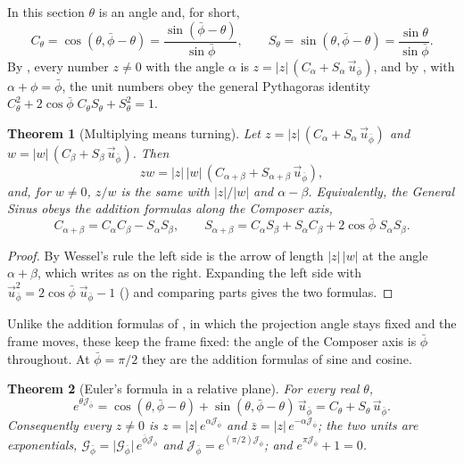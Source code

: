 \documentclass[11pt,a4paper]{amsart}
\theoremstyle{plain}
\newtheorem{theorem}{Theorem}[section]
\theoremstyle{definition}
\theoremstyle{remark}
\newcommand{\pb}{\bar{\phi}}                     %
\newcommand{\Gp}{\mathcal{G}_{\bar{\phi}}}       %
\newcommand{\up}{\vec{u}_{\bar{\phi}}}           %
\newcommand{\Jp}{\mathcal{J}_{\bar{\phi}}}       %
\begin{document}
In this section $\theta$ is an angle and, for short,
\[
C_\theta = \cos(\theta, \pb - \theta) = \frac{\sin(\pb - \theta)}{\sin\pb} , \qquad S_\theta = \sin(\theta, \pb - \theta) = \frac{\sin\theta}{\sin\pb} .
\]
By , every number $z \neq 0$ with the angle $\alpha$ is $z = \lvert z\rvert\,(C_\alpha + S_\alpha\,\up)$, and by , with $\alpha + \phi = \pb$, the unit numbers obey the general Pythagoras identity $C_\theta^2 + 2\cos\pb\;C_\theta S_\theta + S_\theta^2 = 1$.

\begin{theorem}[Multiplying means turning]\label{thm:turning}
Let $z = \lvert z\rvert\,(C_\alpha + S_\alpha\,\up)$ and $w = \lvert w\rvert\,(C_\beta + S_\beta\,\up)$. Then
\[
zw = \lvert z\rvert\,\lvert w\rvert\,(C_{\alpha + \beta} + S_{\alpha + \beta}\,\up) ,
\]
and, for $w \neq 0$, $z/w$ is the same with $\lvert z\rvert/\lvert w\rvert$ and $\alpha - \beta$. Equivalently, the General Sinus obeys the \emph{addition formulas along the Composer axis},
\[
C_{\alpha + \beta} = C_\alpha C_\beta - S_\alpha S_\beta , \qquad S_{\alpha + \beta} = C_\alpha S_\beta + S_\alpha C_\beta + 2\cos\pb\;S_\alpha S_\beta .
\]
\end{theorem}

\begin{proof}
By Wessel's rule the left side is the arrow of length $\lvert z\rvert\,\lvert w\rvert$ at the angle $\alpha + \beta$, which  writes as on the right. Expanding the left side with $\up^2 = 2\cos\pb\;\up - 1$ () and comparing parts gives the two formulas.
\end{proof}

Unlike the addition formulas of , in which the projection angle stays fixed and the frame moves, these keep the frame fixed: the angle of the Composer axis is $\pb$ throughout. At $\pb = \pi/2$ they are the addition formulas of sine and cosine.

\begin{theorem}[Euler's formula in a relative plane]\label{thm:euler}
For every real $\theta$,
\[
e^{\theta\Jp} = \cos(\theta, \pb - \theta) + \sin(\theta, \pb - \theta)\,\up = C_\theta + S_\theta\,\up .
\]
Consequently every $z \neq 0$ is $z = \lvert z\rvert\,e^{\alpha\Jp}$ and $\bar{z} = \lvert z\rvert\,e^{-\alpha\Jp}$; the two units are exponentials, $\Gp = \lvert\Gp\rvert\,e^{\pb\Jp}$ and $\Jp = e^{(\pi/2)\Jp}$; and $e^{\pi\Jp} + 1 = 0$.
\end{theorem}
\end{document}
